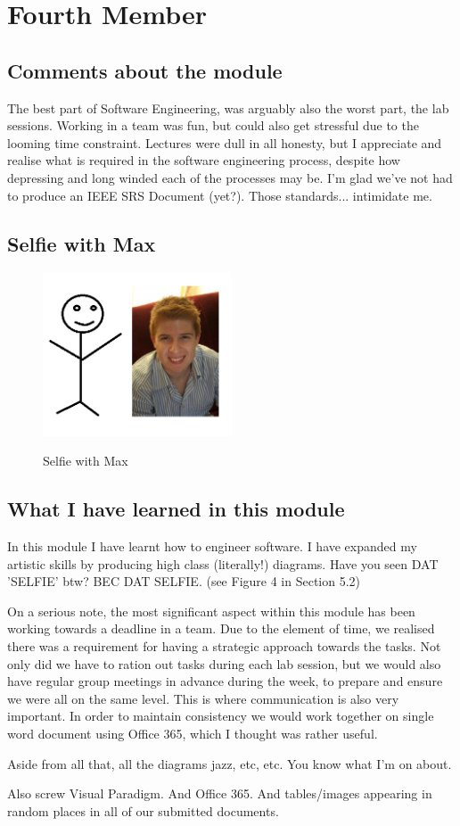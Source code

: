 \section{Fourth Member}

\subsection{Comments about the module}
The best part of Software Engineering, was arguably also the worst part, the lab sessions. Working in a team was fun, but could also get stressful due to the looming time constraint. Lectures were dull in all honesty, but I appreciate and realise what is required in the software engineering process, despite how depressing and long winded each of the processes may be. I'm glad we've not had to produce an IEEE SRS Document (yet?). Those standards... intimidate me. 

\subsection{Selfie with Max}

\begin{figure}[h]
\caption{Selfie with Max}
\centering
\includegraphics[width=0.5\textwidth]{superiorSelfieWithMax}
\label{fig:selfie}
\end{figure}

\subsection{What I have learned in this module}

In this module I have learnt how to engineer software. 
I have expanded my artistic skills by producing high class (literally!) diagrams.
Have you seen DAT 'SELFIE' btw? BEC DAT SELFIE. (see Figure 4 in Section 5.2)


On a serious note, the most significant aspect within this module has been working towards a deadline in a team. Due to the element of time, we realised there was a requirement for having a strategic approach towards the tasks. Not only did we have to ration out tasks during each lab session, but we would also have regular group meetings in advance during the week, to prepare and ensure we were all on the same level. This is where communication is also very important. In order to maintain consistency we would work together on single word document using Office 365, which I thought was rather useful.


Aside from all that, all the diagrams jazz, etc, etc. You know what I'm on about.

Also screw Visual Paradigm. And Office 365. And tables/images appearing in random places in all of our submitted documents.